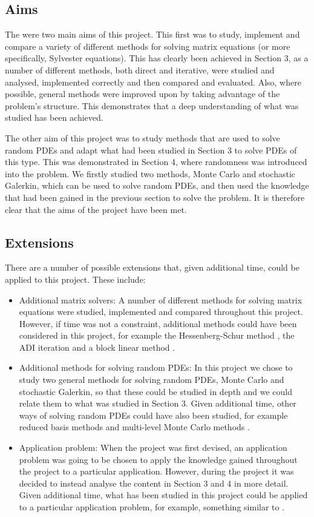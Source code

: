 \documentclass[11pt]{article}
\numberwithin{equation}{section}
\begin{document}
\subsection{Aims}
The were two main aims of this project. This first was to study, implement and compare a variety of different methods for solving matrix equations (or more specifically, Sylvester equations). This has clearly been achieved in Section 3, as a number of different methods, both direct and iterative, were studied and analysed, implemented correctly and then compared and evaluated. Also, where possible, general methods were improved upon by taking advantage of the problem's structure. This demonstrates that a deep understanding of what was studied has been achieved.

The other aim of this project was to study methods that are used to solve random PDEs and adapt what had been studied in Section 3 to solve PDEs of this type. This was demonstrated in Section 4, where randomness was introduced into the problem. We firstly studied two methods, Monte Carlo and stochastic Galerkin, which can be used to solve random PDEs, and then used the knowledge that had been gained in the previous section to solve the problem. It is therefore clear that the aims of the project have been met.

\subsection{Extensions}
There are a number of possible extensions that, given additional time, could be applied to this project. These include:
\begin{itemize}
\item Additional matrix solvers: A number of different methods for solving matrix equations were studied, implemented and compared throughout this project. However, if time was not a constraint, additional methods could have been considered in this project, for example the Hessenberg-Schur method \cite{Hessenberg}, the ADI iteration \cite{Simoncini} and a block linear method \cite{Monsalve}.
\item Additional methods for solving random PDEs: In this project we chose to study two general methods for solving random PDEs, Monte Carlo and stochastic Galerkin, so that these could be studied in depth and we could relate them to what was studied in Section 3. Given additional time, other ways of solving random PDEs could have also been studied, for example reduced basis methods \cite{Powell} and multi-level Monte Carlo methods \cite{Barth}.
\item Application problem: When the project was first devised, an application problem was going to be chosen to apply the knowledge gained throughout the project to a particular application. However, during the project it was decided to instead analyse the content in Section 3 and 4 in more detail. Given additional time, what has been studied in this project could be applied to a particular application problem, for example, something similar to \cite{Barreira}.
\end{itemize}
\end{document}
